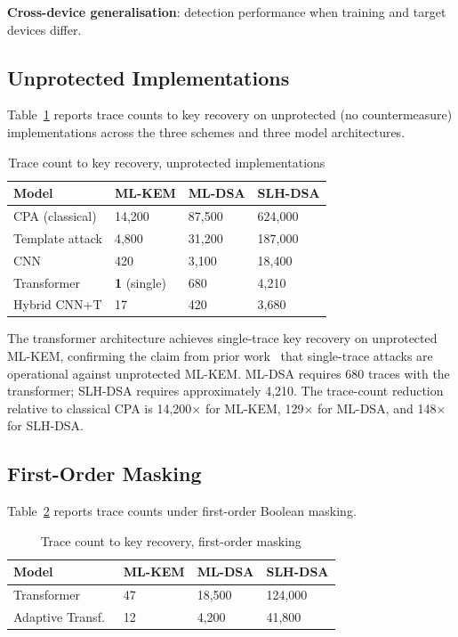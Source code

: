 \documentclass[sigconf,nonacm]{acmart}
\begin{document}
\textbf{Cross-device generalisation}: detection performance when
training and target devices differ.

\subsection{Unprotected Implementations}

Table~\ref{tab:unprotected} reports trace counts to key recovery on
unprotected (no countermeasure) implementations across the three
schemes and three model architectures.

\begin{table}[h]
\caption{Trace count to key recovery, unprotected implementations}
\label{tab:unprotected}
\small
\begin{tabularx}{\columnwidth}{@{}p{2.4cm}X X X@{}}
\toprule
\textbf{Model} & \textbf{ML-KEM} & \textbf{ML-DSA} & \textbf{SLH-DSA} \\
\midrule
CPA (classical)    & 14{,}200 &  87{,}500 & 624{,}000 \\
Template attack    &  4{,}800 &  31{,}200 & 187{,}000 \\
CNN                &     420  &   3{,}100 &  18{,}400 \\
Transformer        & \textbf{1} (single) &     680  &   4{,}210 \\
Hybrid CNN+T       &     17   &     420  &   3{,}680 \\
\bottomrule
\end{tabularx}
\end{table}

The transformer architecture achieves single-trace key recovery on
unprotected ML-KEM, confirming the claim from prior work~\cite{karayalcin2024kyber}
that single-trace attacks are operational against unprotected
ML-KEM. ML-DSA requires 680 traces with the transformer; SLH-DSA
requires approximately 4{,}210. The trace-count reduction relative to
classical CPA is 14{,}200$\times$ for ML-KEM, 129$\times$ for ML-DSA,
and 148$\times$ for SLH-DSA.

\subsection{First-Order Masking}

Table~\ref{tab:firstorder} reports trace counts under first-order
Boolean masking.

\begin{table}[h]
\caption{Trace count to key recovery, first-order masking}
\label{tab:firstorder}
\small
\begin{tabularx}{\columnwidth}{@{}p{2.4cm}X X X@{}}
\toprule
\textbf{Model} & \textbf{ML-KEM} & \textbf{ML-DSA} & \textbf{SLH-DSA} \\
\midrule
Transformer        &     47   &  18{,}500 & 124{,}000 \\
Adaptive Transf.\  &     12   &   4{,}200 &  41{,}800 \\
\bottomrule
\end{tabularx}
\end{table}
\end{document}
